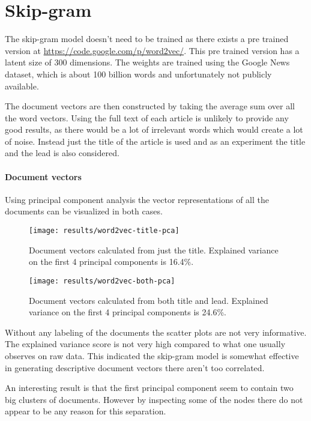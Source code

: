 \section{Skip-gram}

The skip-gram model doesn't need to be trained as there exists a pre trained version at \url{https://code.google.com/p/word2vec/}. This pre trained version has a latent size of 300 dimensions. The weights are trained using the Google News dataset, which is about 100 billion words and unfortunately not publicly available.

The document vectors are then constructed by taking the average sum over all the word vectors. Using the full text of each article is unlikely to provide any good results, as there would be a lot of irrelevant words which would create a lot of noise. Instead just the title of the article is used and as an experiment the title and the lead is also considered.

\paragraph{Document vectors} Using principal component analysis the vector representations of all the documents can be visualized in both cases.
\begin{figure}[H]
	\centering
	\texttt{[image: results/word2vec-title-pca]}
	\caption{Document vectors calculated from just the title. Explained variance on the first 4 principal components is 16.4\%.}
\end{figure}

\begin{figure}[H]
	\centering
	\texttt{[image: results/word2vec-both-pca]}
	\caption{Document vectors calculated from both title and lead. Explained variance on the first 4 principal components is 24.6\%.}
\end{figure}

Without any labeling of the documents the scatter plots are not very informative. The explained variance score is not very high compared to what one usually observes on raw data. This indicated the skip-gram model is somewhat effective in generating descriptive document vectors there aren't too correlated.

An interesting result is that the first principal component seem to contain two big clusters of documents. However by inspecting some of the nodes there do not appear to be any reason for this separation.

